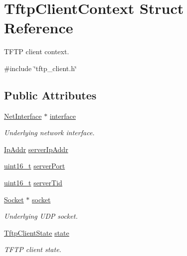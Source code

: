 \hypertarget{structTftpClientContext}{}\section{Tftp\+Client\+Context Struct Reference}
\label{structTftpClientContext}


T\+F\+TP client context.  




{\ttfamily \#include \char`\"{}tftp\+\_\+client.\+h\char`\"{}}

\subsection*{Public Attributes}
\begin{DoxyCompactItemize}
\item 
\hyperlink{net_8h_a2234db8911a1148c9159979d8f5e0d6b}{Net\+Interface} $\ast$ \hyperlink{structTftpClientContext_ad17a07e8c1bfd4a9abaf2dbc46c3049a}{interface}
\begin{DoxyCompactList}\small\item\em Underlying network interface. \end{DoxyCompactList}\item 
\hyperlink{structIpAddr}{Ip\+Addr} \hyperlink{structTftpClientContext_a961c1849ca6750986224145f8b298001}{server\+Ip\+Addr}
\item 
\hyperlink{stdint_8h_a273cf69d639a59973b6019625df33e30}{uint16\+\_\+t} \hyperlink{structTftpClientContext_a4fbd05c69003e22ea5703eabd89ab1c8}{server\+Port}
\item 
\hyperlink{stdint_8h_a273cf69d639a59973b6019625df33e30}{uint16\+\_\+t} \hyperlink{structTftpClientContext_afe82816195c30970687a1b3816e8543d}{server\+Tid}
\item 
\hyperlink{socket_8h_aa85acfb0fa336ef495e6ba87fb88fc48}{Socket} $\ast$ \hyperlink{structTftpClientContext_a59b908f8e63aace324a7b8d8a0af72a5}{socket}
\begin{DoxyCompactList}\small\item\em Underlying U\+DP socket. \end{DoxyCompactList}\item 
\hyperlink{tftp__client_8h_a309912fa47abe84e19aafb1f1a9e8174}{Tftp\+Client\+State} \hyperlink{structTftpClientContext_a5458f1f0af1bf1962312b07d364c9d09}{state}
\begin{DoxyCompactList}\small\item\em T\+F\+TP client state. \end{DoxyCompactList}\item 

\end{DoxyCompactItemize}
